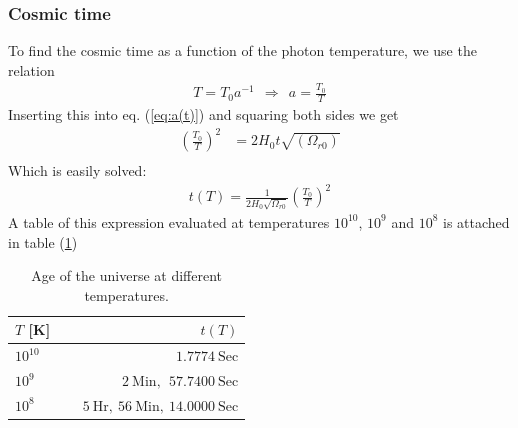 \documentclass[reprint,english,notitlepage]{revtex4-1}  %
\numberwithin{equation}{section}
\begin{document}
\subsubsection{Cosmic time}
To find the cosmic time as a function of the photon temperature, we use the
relation
\begin{align}
	T = T_0 a^{-1} \ \ \Rightarrow \ \ a = \frac{T_0}{T}
\end{align}
Inserting this into eq. (\ref{eq:a(t)}) and squaring both sides we get
\begin{align}
	\left(\frac{T_0}{T}\right)^2 &= 2 H_0 t \sqrt{(\Omega_{r0})} \\
\end{align}
Which is easily solved:
\begin{align}
	t(T) = \frac{1}{2 H_0 \sqrt{\Omega_{r0}}} \left(\frac{T_0}{T}\right)^2
\end{align}
A table of this expression evaluated at temperatures $10^{10}$, $10^9$ and $10^8$
is attached in table (\ref{tab:t(T)})

\begin{table}[h!]
	\begin{tabular}{lr}
	\hline
	      $T$ [K] &   $t(T)$ \\
	\hline
	\hline
	 $10^{10}$ 			& $\ \ \ \ \ \ 1.7774\ \mathrm{Sec}  $\\
	 $10^9$    			& $\ \ \ \ \ \ 2\ \mathrm{Min},\ \ 57.7400\ \mathrm{Sec}$ \\
	 $10^8$    			& $\ \ \ \ \ \ 5\ \mathrm{Hr},\  56\ \mathrm{Min},\ 14.0000\ \mathrm{Sec}$ \\
	\hline
	\hline
	\end{tabular}
	\caption{Age of the universe at different temperatures.}
	\label{tab:t(T)}
\end{table}
\end{document}

